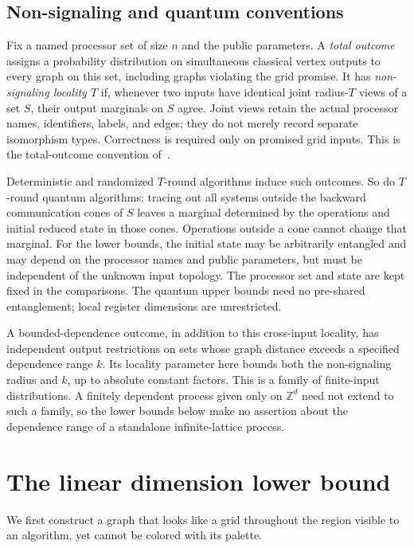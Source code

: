 \documentclass[11pt]{article}
\theoremstyle{definition}\newtheorem{definition}[theorem]{Definition}
\theoremstyle{remark}\newtheorem{remark}[theorem]{Remark}
\newcommand{\Z}{\mathbb Z}
\begin{document}
\subsection{Non-signaling and quantum conventions}\label{sec:models}

Fix a named processor set of size $n$ and the public parameters.
A \emph{total outcome} assigns a probability distribution on
simultaneous classical vertex outputs to every graph on this set,
including graphs violating the grid promise. It has \emph{non-signaling
locality $T$} if, whenever two inputs have identical joint radius-$T$
views of a set $S$, their output marginals on $S$ agree. Joint views
retain the actual processor names, identifiers, labels, and edges;
they do not merely record separate isomorphism types. Correctness is
required only on promised grid inputs. This is the total-outcome
convention of~\cite{NScolor}.

Deterministic and randomized $T$-round algorithms induce such outcomes.
So do $T$-round quantum algorithms: tracing out all systems outside
the backward communication cones of $S$ leaves a marginal determined
by the operations and initial reduced state in those cones. Operations
outside a cone cannot change that marginal. For the lower bounds, the
initial state may be arbitrarily entangled and may depend on the
processor names and public parameters, but must be independent of
the unknown input topology. The processor set and state are kept
fixed in the comparisons. The quantum upper bounds need no
pre-shared entanglement; local register dimensions are unrestricted.

A bounded-dependence outcome, in addition to this cross-input locality,
has independent output restrictions on sets whose graph distance
exceeds a specified dependence range $k$. Its locality parameter
here bounds both the non-signaling radius and $k$, up to absolute
constant factors. This is a family of finite-input distributions.
A finitely dependent process given only on $\Z^d$ need not extend
to such a family, so the lower bounds below make no assertion about
the dependence range of a standalone infinite-lattice process.

\section{The linear dimension lower bound}\label{sec:lower}

We first construct a graph that looks like a grid throughout the
region visible to an algorithm, yet cannot be colored with its palette.
\end{document}
